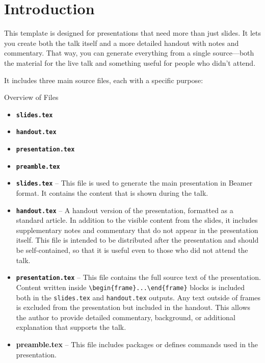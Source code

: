 
\tableofcontents

\section{Introduction}


This template is designed for presentations that need more than just slides.
It lets you create both the talk itself and a more detailed handout with notes and
commentary. That way, you can generate everything from a single source—both the
material for the live talk and something useful for people who didn’t attend.

It includes three main source files, each with a specific purpose:

\begin{frame}[fragile]{Overview of Files}
  \begin{itemize}
   \item \textbf{\texttt{slides.tex}} 
   \item \textbf{\texttt{handout.tex}}
   \item \textbf{\texttt{presentation.tex}}
   \item \textbf{\texttt{preamble.tex}}
  \end{itemize}
\end{frame}
\begin{itemize}
  \item \textbf{\texttt{slides.tex}} – This file is used to generate the main presentation in Beamer format. It contains the content that is shown during the talk.
  
  \item \textbf{\texttt{handout.tex}} – A handout version of the presentation, formatted as a standard article. In addition to the visible content from the slides, it includes supplementary notes and commentary that do not appear in the presentation itself. This file is intended to be distributed after the presentation and should be self-contained, so that it is useful even to those who did not attend the talk.
  
  \item \textbf{\texttt{presentation.tex}} – This file contains the full source text of the presentation. Content written inside \verb|\begin|\verb|{frame}...\end{frame}| blocks is included both in the \texttt{slides.tex} and \texttt{handout.tex} outputs. Any text outside of frames is excluded from the presentation but included in the handout. This allows the author to provide detailed commentary, background, or additional explanation that supports the talk.

  \item \textbf{preamble.tex} – This file includes packages or defines commands used in the presentation.
\end{itemize}


